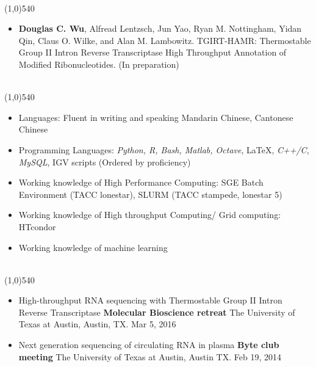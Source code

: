\documentclass[dvips,11pt]{article}
\begin{document}
\bigskip
{} \vspace{-1.5mm}
\\\noindent
\line(1,0){540}\\
 \vspace{-6mm}
\begin{itemize}
	\setlength{\itemsep}{0pt}
	\item {\bf Douglas C. Wu}, Alfread Lentzsch, Jun Yao, Ryan M. Nottingham, Yidan Qin, Claus O. Wilke, and Alan M. Lambowitz. TGIRT-HAMR: Thermostable Group II Intron Reverse Transcriptase High Throughput Annotation of Modified Ribonucleotides. (In preparation)
\end{itemize}



 \vspace{-2mm}
\\\noindent
\vspace{-7mm}
\line(1,0){540}\\

\begin{itemize} \itemsep 1pt \parskip 0pt \parsep 0pt
	\setlength{\itemsep}{0pt}
	\item	Languages: Fluent in writing and speaking Mandarin Chinese, Cantonese Chinese
	\item	Programming Languages: {\it Python, R, Bash, Matlab, Octave}, \LaTeX, {\it C++/C},  {\it MySQL}, IGV scripts (Ordered by proficiency)
	\item Working knowledge of High Performance Computing: SGE Batch Environment (TACC lonestar), SLURM (TACC stampede, lonestar 5)
	\item Working knowledge of High throughput Computing/ Grid computing: HTcondor
	\item Working knowledge of machine learning
\end{itemize}
\newpage

 \vspace{-1.5mm}
\\\noindent
\line(1,0){540}\\
\vspace{-6mm}
\begin{itemize}
	\setlength{\itemsep}{0pt}
	\item High-throughput RNA sequencing with Thermostable Group II Intron Reverse Transcriptase \newline
		{\bf Molecular Bioscience retreat} \newline
		The University of Texas at Austin, Austin, TX. Mar 5, 2016
	\item Next generation sequencing of circulating RNA in plasma \newline
		{\bf Byte club meeting} \newline
		The University of Texas at Austin, Austin TX. Feb 19, 2014
\end{itemize}
\end{document}
